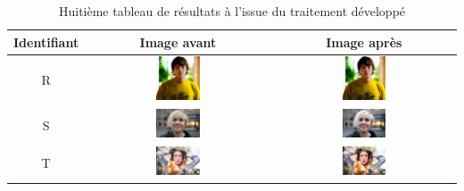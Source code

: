 \documentclass[11pt, french,screen]{report-rd-info}
\begin{document}
\begin{table}
\centering
\begin{tabular}{|c|c|c|}	
   \hline \textbf{Identifiant}  &  \textbf{Image avant}  &  \textbf{Image après}  \\ \hline 
   R & \includegraphics[width=0.25\textwidth]{Resultats/pr_avant} & \includegraphics[width=0.25\textwidth]{Resultats/pr_apres} \\ \hline   
   S & \includegraphics[width=0.25\textwidth]{Resultats/ps_avant} & \includegraphics[width=0.25\textwidth]{Resultats/ps_apres} \\ \hline
   T & \includegraphics[width=0.25\textwidth]{Resultats/pt_avant} & \includegraphics[width=0.25\textwidth]{Resultats/pt_apres} \\ \hline   
\end{tabular}
\caption{Huitième tableau de résultats à l'issue du traitement développé}
\label{tab:Resultats8}
\end{table}
\end{document}
